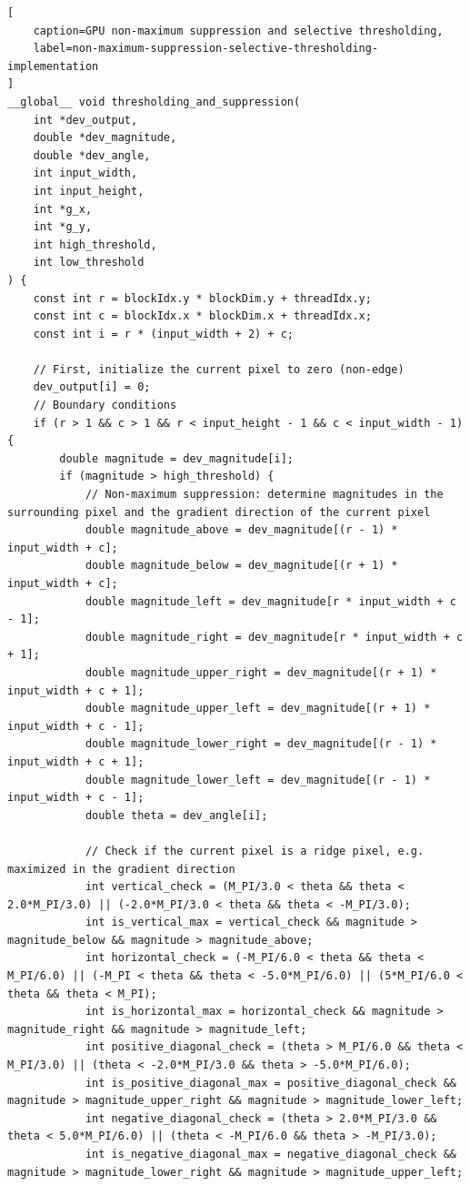 \documentclass[journal]{IEEEtran}
\begin{document}
\begin{lstlisting}[
	caption=GPU non-maximum suppression and selective thresholding,
	label=non-maximum-suppression-selective-thresholding-implementation
]
__global__ void thresholding_and_suppression(
	int *dev_output,
	double *dev_magnitude,
	double *dev_angle,
	int input_width,
	int input_height,
	int *g_x,
	int *g_y,
	int high_threshold,
	int low_threshold
) {
	const int r = blockIdx.y * blockDim.y + threadIdx.y;
	const int c = blockIdx.x * blockDim.x + threadIdx.x;
    const int i = r * (input_width + 2) + c;

    // First, initialize the current pixel to zero (non-edge)
    dev_output[i] = 0;
    // Boundary conditions
    if (r > 1 && c > 1 && r < input_height - 1 && c < input_width - 1) {
        double magnitude = dev_magnitude[i];
        if (magnitude > high_threshold) {
        	// Non-maximum suppression: determine magnitudes in the surrounding pixel and the gradient direction of the current pixel
        	double magnitude_above = dev_magnitude[(r - 1) * input_width + c];
			double magnitude_below = dev_magnitude[(r + 1) * input_width + c];
			double magnitude_left = dev_magnitude[r * input_width + c - 1];
			double magnitude_right = dev_magnitude[r * input_width + c + 1];
			double magnitude_upper_right = dev_magnitude[(r + 1) * input_width + c + 1];
			double magnitude_upper_left = dev_magnitude[(r + 1) * input_width + c - 1];
			double magnitude_lower_right = dev_magnitude[(r - 1) * input_width + c + 1];
			double magnitude_lower_left = dev_magnitude[(r - 1) * input_width + c - 1];
			double theta = dev_angle[i];
		
			// Check if the current pixel is a ridge pixel, e.g. maximized in the gradient direction
			int vertical_check = (M_PI/3.0 < theta && theta < 2.0*M_PI/3.0) || (-2.0*M_PI/3.0 < theta && theta < -M_PI/3.0);
			int is_vertical_max = vertical_check && magnitude > magnitude_below && magnitude > magnitude_above;
			int horizontal_check = (-M_PI/6.0 < theta && theta < M_PI/6.0) || (-M_PI < theta && theta < -5.0*M_PI/6.0) || (5*M_PI/6.0 < theta && theta < M_PI);
			int is_horizontal_max = horizontal_check && magnitude > magnitude_right && magnitude > magnitude_left;
	        int positive_diagonal_check = (theta > M_PI/6.0 && theta < M_PI/3.0) || (theta < -2.0*M_PI/3.0 && theta > -5.0*M_PI/6.0);
			int is_positive_diagonal_max = positive_diagonal_check && magnitude > magnitude_upper_right && magnitude > magnitude_lower_left;
			int negative_diagonal_check = (theta > 2.0*M_PI/3.0 && theta < 5.0*M_PI/6.0) || (theta < -M_PI/6.0 && theta > -M_PI/3.0);
			int is_negative_diagonal_max = negative_diagonal_check && magnitude > magnitude_lower_right && magnitude > magnitude_upper_left;
		

\end{lstlisting}
\end{document}
